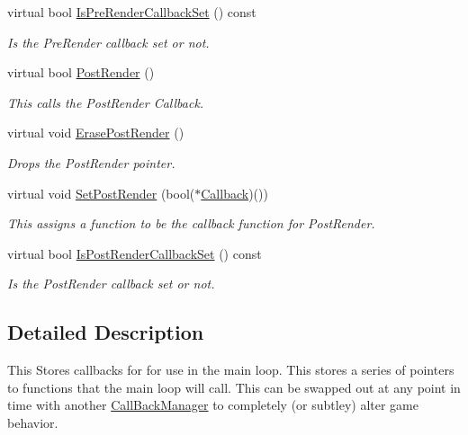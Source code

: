 \begin{DoxyCompactItemize}
virtual bool \hyperlink{classphys_1_1CallBackManager_a91017cc0aa4a04e74fd8f9ca0895b6f8}{IsPreRenderCallbackSet} () const 
\begin{DoxyCompactList}\small\item\em Is the PreRender callback set or not. \item\end{DoxyCompactList}\item 
virtual bool \hyperlink{classphys_1_1CallBackManager_aa1a1132e877d989ecea08a16ee4b3ac1}{PostRender} ()
\begin{DoxyCompactList}\small\item\em This calls the PostRender Callback. \item\end{DoxyCompactList}\item 
virtual void \hyperlink{classphys_1_1CallBackManager_a0eef22a8df4dc87289a18f0e6a1d0baf}{ErasePostRender} ()
\begin{DoxyCompactList}\small\item\em Drops the PostRender pointer. \item\end{DoxyCompactList}\item 
virtual void \hyperlink{classphys_1_1CallBackManager_afe6a91491f3872599d2c5784a902361a}{SetPostRender} (bool($\ast$\hyperlink{classphys_1_1ManagerBase_a753f5f0127131529767beab2502f480b}{Callback})())
\begin{DoxyCompactList}\small\item\em This assigns a function to be the callback function for PostRender. \item\end{DoxyCompactList}\item 
virtual bool \hyperlink{classphys_1_1CallBackManager_aab2be377bc741b893e83dc69cadc0f76}{IsPostRenderCallbackSet} () const 
\begin{DoxyCompactList}\small\item\em Is the PostRender callback set or not. \item\end{DoxyCompactList}\end{DoxyCompactItemize}


\subsection{Detailed Description}
This Stores callbacks for for use in the main loop. This stores a series of pointers to functions that the main loop will call. This can be swapped out at any point in time with another \hyperlink{classphys_1_1CallBackManager}{CallBackManager} to completely (or subtley) alter game behavior. 

